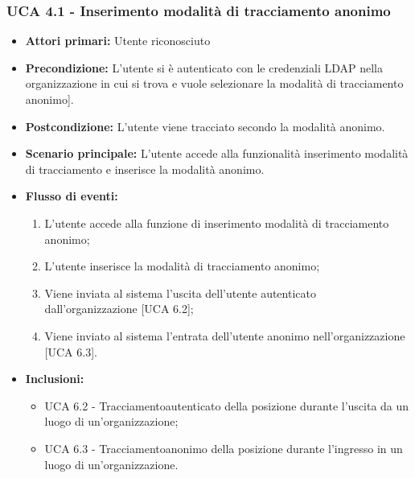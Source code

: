 \subsubsection{UCA 4.1 - Inserimento modalità di tracciamento anonimo}%
\begin{itemize}
	\item \textbf{Attori primari:} Utente riconosciuto
	\item \textbf{Precondizione:} L'utente si è autenticato con le credenziali LDAP nella organizzazione in cui si trova e vuole selezionare la modalità di tracciamento anonimo].
	\item \textbf{Postcondizione:} L'utente viene tracciato secondo la modalità anonimo.
	\item \textbf{Scenario principale:} L'utente accede alla funzionalità inserimento modalità di tracciamento e inserisce la modalità anonimo.
	\item \textbf{Flusso di eventi:}
	\begin{enumerate}
	\item L'utente accede alla funzione di inserimento modalità di tracciamento anonimo;
	\item L'utente inserisce la modalità di tracciamento anonimo;
	\item Viene inviata al sistema l'uscita dell'utente autenticato dall'organizzazione [UCA 6.2];
	\item Viene inviato al sistema l'entrata dell'utente anonimo nell'organizzazione [UCA 6.3].
	\end{enumerate}
	\item \textbf{Inclusioni:}
	\begin{itemize}
		\item UCA 6.2 - Tracciamentoautenticato della posizione durante l'uscita da un luogo di un'organizzazione;
		\item UCA 6.3 - Tracciamentoanonimo della posizione durante l'ingresso in un luogo di un'organizzazione.
	\end{itemize}
\end{itemize}

